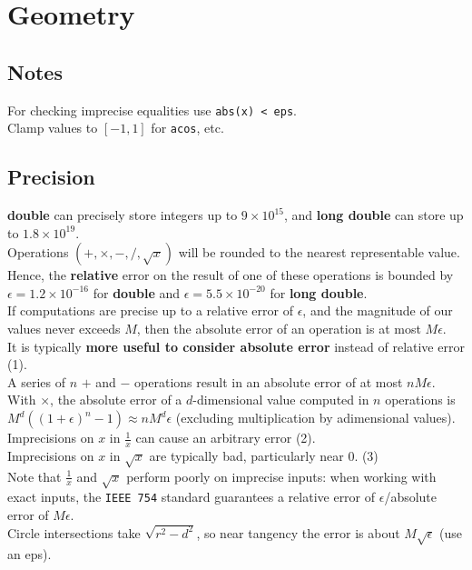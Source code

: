 \chapter{Geometry}

\section{Notes}
	For checking imprecise equalities use \texttt{abs(x) < eps}. \\
	Clamp values to $[-1, 1]$ for \texttt{acos}, etc.

\section{Precision}
	\textbf{double} can precisely store integers up to $9 \times 10^{15}$, and \textbf{long double} can store up to $1.8 \times 10^{19}$. \\	
	Operations $(+, \times, -, /, \sqrt{x})$ will be rounded to the nearest representable value. Hence, the \textbf{relative} error on the result of one of these operations is bounded by $\epsilon = 1.2 \times 10^{-16}$ for \textbf{double} and $\epsilon = 5.5 \times 10^{-20}$ for \textbf{long double}. \\
	If computations are precise up to a relative error of $\epsilon$, and the magnitude of our values never exceeds $M$, then the absolute error of an operation is at most $M \epsilon$. \\
	It is typically \textbf{more useful to consider absolute error} instead of relative error (1). \\

	A series of $n$ $+$ and $-$ operations result in an absolute error of at most $nM\epsilon$. \\
	With $\times$, the absolute error of a $d$-dimensional value computed in $n$ operations is $M^{d}((1+\epsilon)^{n}-1) \approx nM^{d}\epsilon$ (excluding multiplication by adimensional values). \\
	Imprecisions on $x$ in $\frac{1}{x}$ can cause an arbitrary error (2). \\
	Imprecisions on $x$ in $\sqrt{x}$ are typically bad, particularly near $0$. (3) \\

	Note that $\frac{1}{x}$ and $\sqrt{x}$ perform poorly on imprecise inputs: when working with exact inputs, the \texttt{IEEE 754} standard guarantees a relative error of $\epsilon$/absolute error of $M\epsilon$. \\ 
	Circle intersections take $\sqrt{r^2-d^2}$, so near tangency the error is about $M\sqrt{\epsilon}$ (use an eps).

